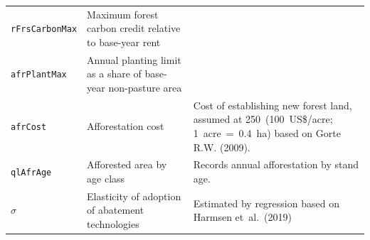 \begin{xltabular}{\linewidth}{l X X}
  \texttt{rFrsCarbonMax} & Maximum forest carbon credit relative to base-year rent & \\
  \texttt{afrPlantMax} & Annual planting limit as a share of base-year non-pasture area & \\
  \texttt{afrCost} & Afforestation cost & Cost of establishing new forest land, assumed at 250~(100~US\$/acre; 1~acre~=~0.4~ha) based on Gorte R.W. (2009). \\
  \texttt{qlAfrAge} & Afforested area by age class & Records annual afforestation by stand age.\\
  $\sigma$ & Elasticity of adoption of abatement technologies & Estimated by regression based on Harmsen et~al.~(2019) \\
\end{xltabular}
